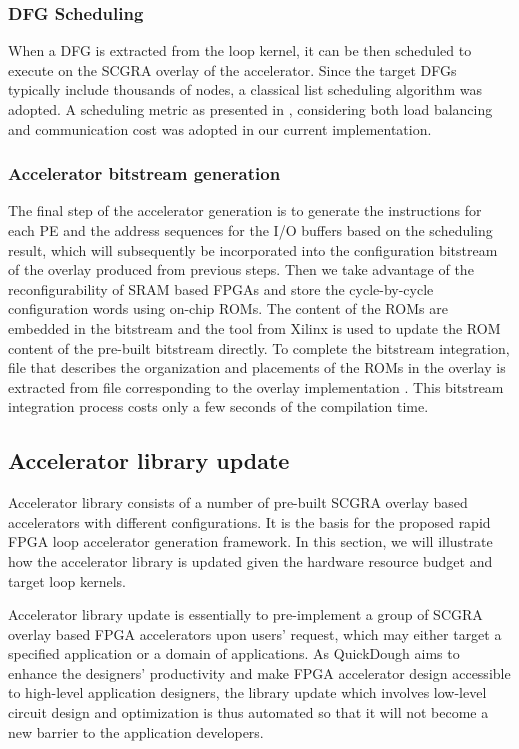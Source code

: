 \subsubsection{DFG Scheduling}
When a DFG is extracted from the loop kernel, it can be then scheduled to execute on the
SCGRA overlay of the accelerator. Since the target DFGs typically include thousands of nodes, a
classical list scheduling algorithm \cite{schutten1996list} was adopted. A scheduling metric as
presented in \cite{colinheart}, considering both load balancing and communication cost was adopted
in our current implementation. 

\subsubsection{Accelerator bitstream generation}
The final step of the accelerator generation is to generate 
the instructions for each PE and the address sequences for the 
I/O buffers based on the scheduling result, which will subsequently 
be incorporated into the configuration bitstream of the overlay produced 
from previous steps. Then we take advantage of the reconfigurability 
of SRAM based FPGAs and store the cycle-by-cycle configuration words 
using on-chip ROMs. The content of the ROMs are embedded in the 
bitstream and the  tool from Xilinx \cite{data2mem} is 
used to update the ROM content of the pre-built bitstream directly. 
To complete the bitstream integration,  file that describes 
the organization and placements of the ROMs in the overlay is extracted 
from  file corresponding to the overlay implementation \cite{beckhoff2011xilinx}.
This bitstream integration process costs only a few seconds of the compilation time.

\subsection{Accelerator library update} 
Accelerator library consists of a number of pre-built SCGRA overlay based accelerators with
different configurations. It is the basis for the proposed rapid FPGA loop accelerator generation
framework. In this section, we will illustrate how the accelerator library is updated
given the hardware resource budget and target loop kernels.

Accelerator library update is essentially to pre-implement a group of SCGRA overlay based FPGA accelerators upon users' request, which may either target a specified application or a domain of applications. As QuickDough aims to enhance the designers' productivity and make FPGA accelerator design accessible to high-level application designers, the library update which involves low-level circuit design and optimization is thus automated so that it will not become a new barrier to the application developers.

